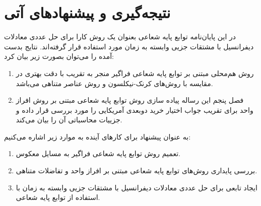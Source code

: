 
\chapter{نتيجه‌گيری و پیشنهادهای آتی}
\label{se:Conclusion}

در این پایان‌نامه توابع پایه شعاعی بعنوان یک روش کارا برای حل عددی معادلات دیفرانسیل با مشتقات جزیی وابسته به زمان مورد استفاده قرار گرفته‌اند. نتایج بدست آمده را می‌توان بصورت زیر بیان کرد:
\begin{enumerate}
\item 
روش هم‌محلی مبتنی بر توابع پایه شعاعی فراگیر منجر به تقریب با دقت بهتری در مقایسه با روش‌های کرنک-نیکلسون و روش عناصر متناهی می‌باشد. 
\item 
فصل پنجم این رساله پیاده سازی روش توابع پایه شعاعی مبتنی بر روش افراز واحد برای تقریب جواب اختیار خرید دوبعدی آمریکایی را مورد بررسی قرار داده و جزییات محاسباتی آن را بیان می‌کند.
\end{enumerate}
به عنوان پیشنهاد برای کارهای آینده به موارد زیر اشاره می‌کنیم:
\begin{enumerate}
\item
تعمیم روش توابع پایه شعاعی فراگیر به مسایل معکوس.
\item
بررسی پایداری روش‌های توابع پایه شعاعی مبتنی بر افراز واحد و تفاضلات متناهی.
\item
ایجاد تابعی برای حل عددی معادلات دیفرانسیل با مشتقات جزیی وابسته به زمان با استفاده از توابع پایه شعاعی.
\end{enumerate}